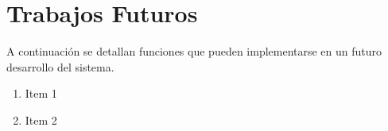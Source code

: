
\section{Trabajos Futuros}

A continuación se detallan funciones que pueden implementarse en un futuro desarrollo del sistema.

\begin{enumerate}
    \item Item 1
    \item Item 2
\end{enumerate}
